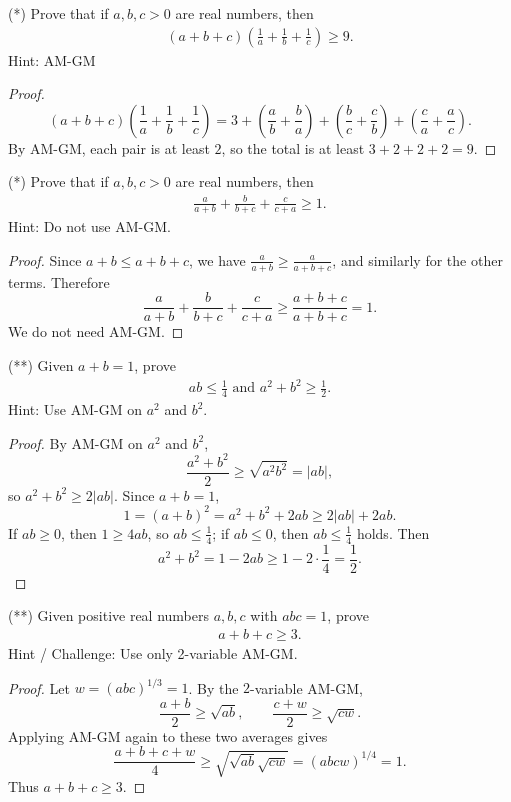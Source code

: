 \documentclass[12pt]{article}
\begin{document}
\begin{problem}
(*) Prove that if $a,b,c > 0$ are real numbers, then 
\begin{align*}
    (a + b + c) \left(\frac{1}{a} + \frac{1}{b} + \frac{1}{c} \right) \geq 9.
\end{align*}
Hint: AM-GM
\begin{proof}
\[
(a+b+c)\left(\frac1a+\frac1b+\frac1c\right)
=3+\left(\frac{a}{b}+\frac{b}{a}\right)+\left(\frac{b}{c}+\frac{c}{b}\right)+\left(\frac{c}{a}+\frac{a}{c}\right).
\]
By AM-GM, each pair is at least $2$, so the total is at least $3+2+2+2=9$.
\end{proof}
\end{problem}  

\begin{problem}
(*) Prove that if $a,b,c > 0$ are real numbers, then 
\begin{align*}
    \frac{a}{a+b} + \frac{b}{b+c} + \frac{c}{c+a} \geq 1.
\end{align*}
Hint: Do not use AM-GM.
\begin{proof}
Since $a+b\le a+b+c$, we have $\frac{a}{a+b}\ge \frac{a}{a+b+c}$, and similarly for the other terms. Therefore
\[
\frac{a}{a+b}+\frac{b}{b+c}+\frac{c}{c+a}\ge \frac{a+b+c}{a+b+c}=1.
\]
We do not need AM-GM.
\end{proof}
\end{problem}

\begin{problem}
(**) Given $a + b = 1$, prove
\begin{align*}
    ab \leq \frac{1}{4} \text{ and } a^2 + b^2 \geq \frac{1}{2}. 
\end{align*}
Hint: Use AM-GM on $a^2$ and $b^2$.
\begin{proof}
By AM-GM on $a^2$ and $b^2$,
\[
\frac{a^2+b^2}{2}\ge \sqrt{a^2b^2}=|ab|,
\]
so $a^2+b^2\ge 2|ab|$. Since $a+b=1$,
\[
1=(a+b)^2=a^2+b^2+2ab\ge 2|ab|+2ab.
\]
If $ab\ge 0$, then $1\ge 4ab$, so $ab\le \frac14$; if $ab\le 0$, then $ab\le \frac14$ holds. Then
\[
a^2+b^2=1-2ab\ge 1-2\cdot\frac14=\frac12.
\]
\end{proof}
\end{problem}

\begin{problem}
(**) Given positive real numbers $a,b,c$ with $abc = 1$, prove
\begin{align*}
    a + b + c \geq 3.
\end{align*}
Hint / Challenge: Use only 2-variable AM-GM.
\begin{proof}
Let $w=(abc)^{1/3}=1$. By the $2$-variable AM-GM,
\[
\frac{a+b}{2}\ge \sqrt{ab},\qquad \frac{c+w}{2}\ge \sqrt{cw}.
\]
Applying AM-GM again to these two averages gives
\[
\frac{a+b+c+w}{4}\ge \sqrt{\sqrt{ab}\sqrt{cw}}=(abcw)^{1/4}=1.
\]
Thus $a+b+c\ge 3$.
\end{proof}
\end{problem}
\end{document}
